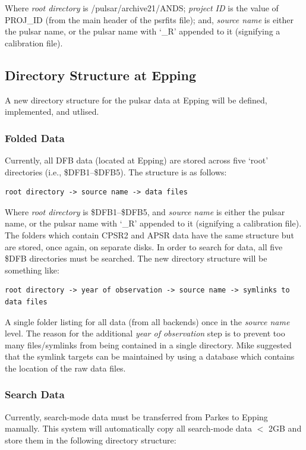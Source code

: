 \documentclass{article}
\begin{document}
Where \emph{root directory} is /pulsar/archive21/ANDS; \emph{project ID} is the value of PROJ\_ID (from the main header of the psrfits file); and, \emph{source name} is either the pulsar name, or the pulsar name with `\_R' appended to it (signifying a calibration file).

\subsection{Directory Structure at Epping}
A new directory structure for the pulsar data at Epping will be defined, implemented, and utlised.

\subsubsection{Folded Data}
Currently, all DFB data (located at Epping) are stored across five `root' directories (i.e., \$DFB1--\$DFB5). The structure is as follows:

\begin{verbatim}
root directory -> source name -> data files
\end{verbatim}

Where \emph{root directory} is \$DFB1--\$DFB5, and \emph{source name} is either the pulsar name, or the pulsar name with `\_R' appended to it (signifying a calibration file). The folders which contain CPSR2 and APSR data have the same structure but are stored, once again, on separate disks. In order to search for data, all five \$DFB directories must be searched. The new directory structure will be something like:

\begin{verbatim}
root directory -> year of observation -> source name -> symlinks to data files
\end{verbatim}

A single folder listing for all data (from all backends) once in the \emph{source name} level. The reason for the additional \emph{year of observation} step is to prevent too many files/symlinks from being contained in a single directory. Mike suggested that the symlink targets can be maintained by using a database which contains the location of the raw data files.

\subsubsection{Search Data}
Currently, search-mode data must be transferred from Parkes to Epping manually. This system will automatically copy all search-mode data $<$ 2GB and store them in the following directory structure:
\end{document}
